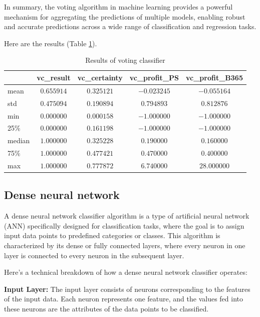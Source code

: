 \documentclass[preprint,aps,nofootinbib,a4paper,superscriptaddress,longbibliography,amsfonts,amssymb,amsmath,titlepage]{revtex4-2}
\begin{document}
In summary, the voting algorithm in machine learning provides a powerful mechanism for aggregating the predictions of multiple models, enabling robust and accurate predictions across a wide range of classification and regression tasks.

Here are the results (Table \ref{vc-result}).
%
\begin{table}[h]
\centering
\caption{Results of voting classifier}
\begin{tabular}{|l|c|c|c|c|}
\hline
& \textbf{vc\_result} & \textbf{vc\_certainty} & \textbf{vc\_profit\_PS}& \textbf{vc\_profit\_B365} \\
\hline
mean & $0.655914$ & $0.325121$ & $-0.023245$ & $-0.055164$ \\
\hline
std & $0.475094$ & $0.190894$ & $0.794893$ & $0.812876$ \\
\hline
min & $0.000000$ & $0.000158$ & $-1.000000$ & $-1.000000$ \\
\hline
25\% & $0.000000$ & $0.161198$ & $-1.000000$ & $-1.000000$ \\
\hline
median & $1.000000$ & $0.325228$ & $0.190000$ & $0.160000$ \\
\hline
75\% & $1.000000$ & $0.477421$ & $0.470000$ & $0.400000$ \\
\hline
max & $1.000000$ & $0.777872$ & $6.740000$ & $28.000000$ \\
\hline
\end{tabular}

\label{vc-result}
\end{table}
%

\subsection{Dense neural network}

A dense neural network classifier algorithm is a type of artificial neural network (ANN) specifically designed for classification tasks, where the goal is to assign input data points to predefined categories or classes. This algorithm is characterized by its dense or fully connected layers, where every neuron in one layer is connected to every neuron in the subsequent layer.

Here's a technical breakdown of how a dense neural network classifier operates:

\textbf{Input Layer:} The input layer consists of neurons corresponding to the features of the input data. Each neuron represents one feature, and the values fed into these neurons are the attributes of the data points to be classified.
\end{document}
